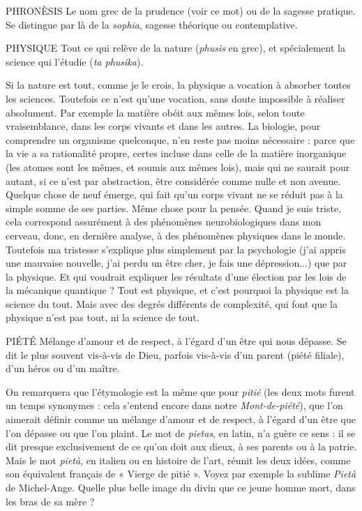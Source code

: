 PHRONÈSIS Le nom grec de la prudence (voir ce mot) ou de la sagesse pratique.
Se distingue par là de la {\it sophia}, sagesse théorique ou
contemplative.

PHYSIQUE Tout ce qui relève de la nature ({\it phusis} en grec), et spécialement
la science qui l’étudie ({\it ta phusika}).

Si la nature est tout, comme je le crois, la physique a vocation à absorber
toutes les sciences. Toutefois ce n’est qu’une vocation, sans doute impossible à
réaliser absolument. Par exemple la matière obéit aux mêmes lois, selon toute
vraisemblance, dans les corps vivants et dans les autres. La biologie, pour comprendre
un organisme quelconque, n’en reste pas moins nécessaire : parce que
la vie a sa rationalité propre, certes incluse dans celle de la matière inorganique
(les atomes sont les mêmes, et soumis aux mêmes lois), mais qui ne saurait pour
autant, si ce n’est par abstraction, être considérée comme nulle et non avenue.
Quelque chose de neuf émerge, qui fait qu’un corps vivant ne se réduit pas à la
simple somme de ses parties. Même chose pour la pensée. Quand je suis triste,
cela correspond assurément à des phénomènes neurobiologiques dans mon cerveau,
donc, en dernière analyse, à des phénomènes physiques dans le monde.
Toutefois ma tristesse s’explique plus simplement par la psychologie (j'ai appris
une mauvaise nouvelle, j'ai perdu un être cher, je fais une dépression...) que
par la physique. Et qui voudrait expliquer les résultats d’une élection par les lois
de la mécanique quantique ? Tout est physique, et c’est pourquoi la physique
est la science du tout. Mais avec des degrés différents de complexité, qui font
que la physique n’est pas tout, ni la science de tout.

PIÉTÉ Mélange d’amour et de respect, à l’égard d’un être qui nous dépasse.
Se dit le plus souvent vis-à-vis de Dieu, parfois vis-à-vis d’un parent
(piété filiale), d’un héros ou d’un maître.

On remarquera que l’étymologie est la même que pour {\it pitié} (les deux mots
furent un temps synonymes : cela s'entend encore dans notre {\it Mont-de-piété}),
que l’on aimerait définir comme un mélange d'amour et de respect, à l'égard
d’un être que l’on dépasse ou que l’on plaint. Le mot de {\it pietas}, en latin, n’a
guère ce sens : il se dit presque exclusivement de ce qu’on doit aux dieux, à ses
parents ou à la patrie. Mais le mot {\it pietà}, en italien ou en histoire de l’art, réunit
les deux idées, comme son équivalent français de « Vierge de pitié ». Voyez par
exemple la sublime {\it Pietà} de Michel-Ange. Quelle plus belle image du divin que
ce jeune homme mort, dans les bras de sa mère ?

